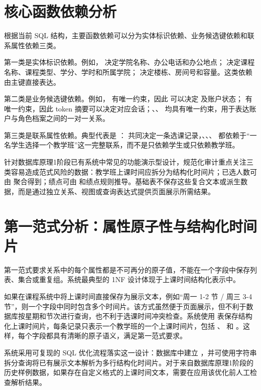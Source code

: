 \section{核心函数依赖分析}

根据当前 SQL 结构，主要函数依赖可以分为实体标识依赖、业务候选键依赖和联系属性依赖三类。

第一类是实体标识依赖。例如， 决定学院名称、办公电话和办公地点； 决定课程名称、课程类型、学分、学时和所属学院； 决定楼栋、房间号和容量。这类依赖由主键直接表达。

第二类是业务候选键依赖。例如， 有唯一约束，因此  可以决定  及账户状态； 有唯一约束，因此 token 摘要可以决定对应会话；、、 均具有唯一约束，用于表达账户与角色档案之间的一对一关系。

第三类是联系属性依赖。典型代表是 ： 共同决定一条选课记录，、、、 都依赖于“一名学生选择一个教学班”这一完整联系，而不是只依赖学生或只依赖教学班。

针对数据库原理1阶段已有系统中常见的功能演示型设计，规范化审计重点关注三类容易造成范式风险的数据：教学班上课时间应拆分为结构化时间片；已选人数可由  聚合得到；绩点可由  和绩点规则推导。基础表不保存这些复合文本或派生数据，而是通过独立关系、视图或查询表达式提供页面展示所需结果。

\section{第一范式分析：属性原子性与结构化时间片}

第一范式要求关系中的每个属性都是不可再分的原子值，不能在一个字段中保存列表、集合或重复组。系统最典型的 1NF 设计体现于上课时间结构化表示中。

如果在课程系统中将上课时间直接保存为展示文本，例如“周一 1-2 节 / 周三 3-4 节”，则一个字段中同时包含多个时间片。该方式虽然便于页面展示，但不利于数据库按星期和节次进行查询，也不利于选课时间冲突检查。系统使用  表保存结构化上课时间片，每条记录只表示一个教学班的一个上课时间片，包括 、 和 。这样，每个字段都具有清晰的原子语义，满足第一范式要求。

系统采用可复现的 SQL 优化流程落实这一设计：数据库中建立 ，并可使用字符串拆分查询将已有展示文本解析为多行结构化时间片。对于来自数据库原理1阶段的历史样例数据，如果存在自定义格式的上课时间文本，需要在应用该优化前人工检查解析结果。

